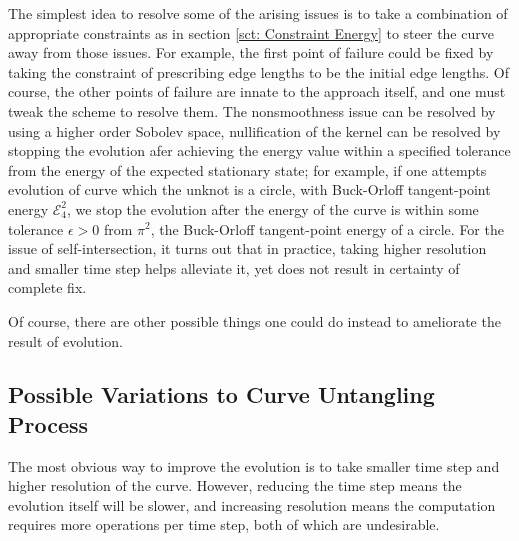 \documentclass[../dissertation.tex]{subfiles}
\begin{document}
The simplest idea to resolve some of the arising issues is to take a combination of appropriate constraints as in section \ref{sct: Constraint Energy} to steer the curve away from those issues.
For example, the first point of failure could be fixed by taking the constraint of prescribing edge lengths to be the initial edge lengths. 
Of course, the other points of failure are innate to the approach itself,
and one must tweak the scheme to resolve them.
The nonsmoothness issue can be resolved by using a higher order Sobolev space,
nullification of the kernel can be resolved by stopping the evolution afer achieving the energy value within a specified tolerance from the energy of the expected stationary state;
for example, if one attempts evolution of curve which the unknot is a circle, with Buck-Orloff tangent-point energy $\mathcal{E}_{4}^{2}$, we stop the evolution after the energy of the curve is within some tolerance $\epsilon > 0$ from $\pi^2$,
the Buck-Orloff tangent-point energy of a circle.
For the issue of self-intersection,
it turns out that in practice, taking higher resolution and smaller time step helps alleviate it,
yet does not result in certainty of complete fix.

Of course, there are other possible things one could do instead to ameliorate the result of evolution.

\subsection{Possible Variations to Curve Untangling Process}
The most obvious way to improve the evolution is to take smaller time step and higher resolution of the curve.
However, reducing the time step means the evolution itself will be slower,
and increasing resolution means the computation requires more operations per time step,
both of which are undesirable.
\end{document}
